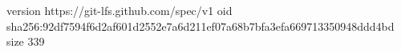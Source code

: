 version https://git-lfs.github.com/spec/v1
oid sha256:92df7594f6d2af601d2552e7a6d211ef07a68b7bfa3efa669713350948ddd4bd
size 339
